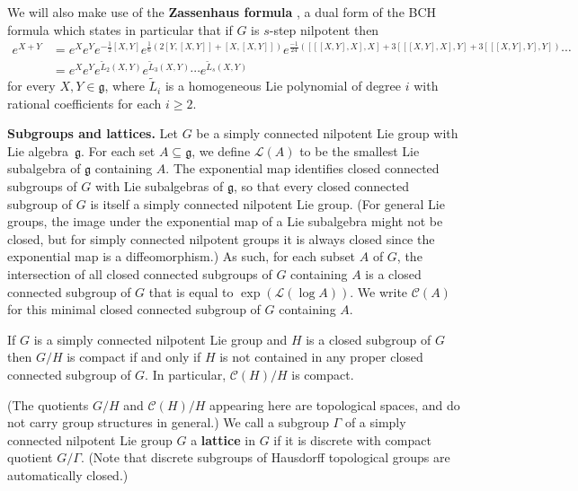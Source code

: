 We will also make use of the \textbf{Zassenhaus formula} \cite{casas2012efficient}, a dual form of the BCH formula which states in particular that if $G$ is $s$-step nilpotent then
\begin{align}
e^{X+Y}&= e^{X} e^{Y} e^{-\frac{1}{2} [X,Y]} 
e^{\frac{1}{6}(2[Y,[X,Y]]+ [X,[X,Y]] )} 
e^{\frac{-1}{24}([[[X,Y],X],X] + 3[[[X,Y],X],Y] + 3[[[X,Y],Y],Y]) } \cdots\nonumber\\
&= e^Xe^Y e^{\tilde L_2(X,Y)}e^{\tilde L_3(X,Y)} \cdots e^{\tilde L_s(X,Y)}
\end{align}
for every $X,Y\in \mathfrak{g}$, where $\tilde L_i$ is a homogeneous Lie polynomial of degree $i$ with rational coefficients for each $i\geq 2$.

\medskip

 \textbf{Subgroups and lattices.}
Let $G$ be a simply connected nilpotent Lie group with Lie algebra~$\mathfrak{g}$. For each set $A\subseteq \mathfrak{g}$, we define $\mathscr{L}(A)$ to be the smallest Lie subalgebra of $\mathfrak{g}$ containing $A$. The exponential map identifies closed connected subgroups of $G$ with Lie subalgebras of $\mathfrak{g}$, so that every closed connected subgroup of $G$ is itself a simply connected nilpotent Lie group. (For general Lie groups, the image under the exponential map of a Lie subalgebra might not be closed, but for simply connected nilpotent groups it is always closed since the exponential map is a diffeomorphism.) As such, for each subset $A$ of $G$, the intersection of all closed connected subgroups of $G$ containing $A$ is a closed connected subgroup of $G$ that is equal to $\exp(\mathscr{L}(\log A))$. We write $\mathscr{C}(A)$ for this minimal closed connected subgroup of $G$ containing $A$.

\begin{thm}
If $G$ is a simply connected nilpotent Lie group and $H$ is a closed subgroup of $G$ then $G/H$ is compact if and only if $H$ is not contained in any proper closed connected subgroup of $G$. In particular, $\mathscr{C}(H)/H$ is compact.
%
\end{thm}

(The quotients $G/H$ and $\mathscr{C}(H)/H$  appearing here are topological spaces, and do not carry group structures in general.)
We call a subgroup $\Gamma$ of a simply connected nilpotent Lie group $G$ a \textbf{lattice} in $G$ if it is discrete with compact quotient $G/\Gamma$. (Note that discrete subgroups of Hausdorff topological groups are automatically closed.)

